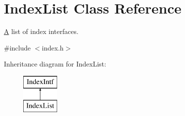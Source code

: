 \hypertarget{class_index_list}{}\section{Index\+List Class Reference}
\label{class_index_list}


\mbox{\hyperlink{class_a}{A}} list of index interfaces.  




{\ttfamily \#include $<$index.\+h$>$}

Inheritance diagram for Index\+List\+:\begin{figure}[H]
\begin{center}
\leavevmode
\includegraphics[height=2.000000cm]{class_index_list}
\end{center}
\end{figure}
